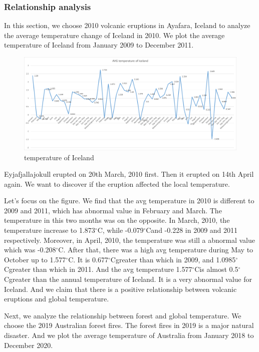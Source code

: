 \documentclass{apmcmthesis}
\def\oc{$^{\circ}$C\;}
\begin{document}
  \subsubsection{Relationship analysis}
  In this section, we choose 2010 volcanic eruptions in Ayafara, Iceland to analyze the average temperature change of Iceland in 2010.
  We plot the average temperature of Iceland from January 2009 to December 2011.
  
  \begin{figure}[htbp]
    \centering
    \includegraphics[scale=0.45]{Iceland.png}
    \caption{temperature of Iceland}
  \end{figure}
  
  Eyjafjallajokull erupted on 20th March, 2010 first.
  Then it erupted on 14th April again.
  We want to discover if the eruption affected the local temperature. 
  
  Let's focus on the figure.
  We find that the avg temperature in 2010 is different to 2009 and 2011, which has abnormal value in February and March.
  The temperature in this two months was on the opposite. 
  In March, 2010, the temperature increase to 1.873\oc, while -0.079\oc and -0.228 in 2009 and 2011 respectively.
  Moreover, in April, 2010, the temperature was still a abnormal value which was -0.208\oc.
  After that, there was a high avg temperature during May to October up to 1.577\oc.
  It is 0.677\oc greater than which in 2009, and 1.0985\oc greater than which in 2011.
  And the avg temperature 1.577\oc is almost 0.5\oc greater than the annual temperature of Iceland.
  It is a very abnormal value for Iceland.
  And we claim that there is a positive relationship between volcanic eruptions and global temperature. 
  
  Next, we analyze the relationship between forest and global temperature.
  We choose the 2019 Australian forest fires.
  The forest fires in 2019 is a major natural disaster. 
  And we plot the average temperature of Australia from January 2018 to December 2020.
  
\end{document}
